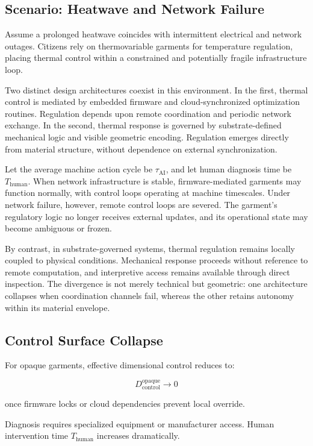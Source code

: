 \documentclass[11pt]{article}
\begin{document}
\subsection{Scenario: Heatwave and Network Failure}

Assume a prolonged heatwave coincides with intermittent electrical and
network outages. Citizens rely on thermovariable garments for
temperature regulation, placing thermal control within a constrained and
potentially fragile infrastructure loop.

Two distinct design architectures coexist in this environment. In the
first, thermal control is mediated by embedded firmware and
cloud-synchronized optimization routines. Regulation depends upon remote
coordination and periodic network exchange. In the second, thermal
response is governed by substrate-defined mechanical logic and visible
geometric encoding. Regulation emerges directly from material structure,
without dependence on external synchronization.

Let the average machine action cycle be $\tau_{\text{AI}}$, and let human
diagnosis time be $T_{\text{human}}$. When network infrastructure is
stable, firmware-mediated garments may function normally, with control
loops operating at machine timescales. Under network failure, however,
remote control loops are severed. The garment’s regulatory logic no
longer receives external updates, and its operational state may become
ambiguous or frozen.

By contrast, in substrate-governed systems, thermal regulation remains
locally coupled to physical conditions. Mechanical response proceeds
without reference to remote computation, and interpretive access remains
available through direct inspection. The divergence is not merely
technical but geometric: one architecture collapses when coordination
channels fail, whereas the other retains autonomy within its material
envelope.

\subsection{Control Surface Collapse}

For opaque garments, effective dimensional control reduces to:

\[
D_{\text{control}}^{\text{opaque}} \rightarrow 0
\]

once firmware locks or cloud dependencies prevent local override.

Diagnosis requires specialized equipment or manufacturer access. 
Human intervention time $T_{\text{human}}$ increases dramatically.
\end{document}

